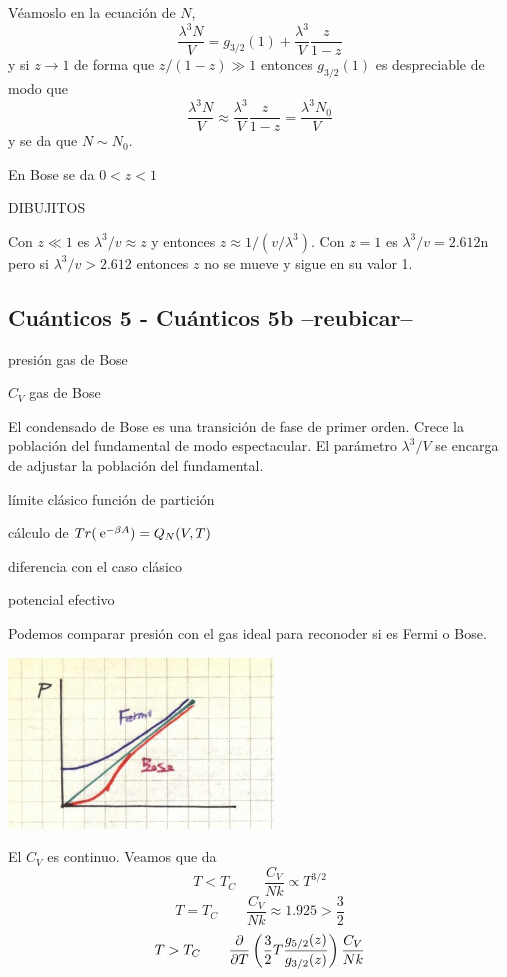 \documentclass[10pt,oneside]{CBFT_book}
\begin{document}
Véamoslo en la ecuación de $N$,
\[
	\frac{\lambda^3 N}{V} = g_{3/2}(1) + \frac{\lambda^3}{V} \frac{z}{1-z}
\]
y si $z \to 1$ de forma que $z/(1-z) \gg 1$ entonces $g_{3/2}(1)$ es despreciable de modo que
\[
	\frac{\lambda^3 N}{V} \approx \frac{\lambda^3}{V} \frac{z}{1-z} = \frac{\lambda^3 N_0}{V} 
\]
y se da que $ N \sim N_0 $.

En Bose se da $ 0 < z < 1$

DIBUJITOS

Con $ z \ll 1$ es $ \lambda^3 / v \approx z $ y entonces $ z \approx 1/ (v/\lambda^3) $.
Con $ z=1 $ es $ \lambda^3 / v = 2.612$n pero si $ \lambda^3 / v > 2.612 $ entonces $z$ no se mueve y
sigue en su valor 1.


\subsection{Cuánticos 5 - Cuánticos 5b --reubicar--}

presión gas de Bose

$C_V$ gas de Bose

El condensado de Bose es una transición de fase de primer orden.
Crece la población del fundamental de modo espectacular. El parámetro $ \lambda^3/V $ se encarga de
adjustar la población del fundamental.

límite clásico función de partición

cálculo de $ Tr (\:\mathrm{e}^{-\beta A} ) = Q_N(V,T) $

diferencia con el caso clásico

potencial efectivo


Podemos comparar presión con el gas ideal para reconoder si es Fermi o Bose.

\includegraphics[scale=0.5]{images/1606329551.jpg}


El $C_V$ es continuo. Veamos que da
\[
	T<T_C \qquad \frac{C_V}{Nk} \propto T^{3/2}
\]
\[
	T=T_C \qquad \frac{C_V}{Nk} \approx 1.925 > \frac 3 2
\]
\[
	T>T_C \qquad \frac{\partial^{\hspace{-0.05em}} {}}{\partial {T}^{\hspace{-0.05em}}}\left( \frac{3}{2} T \frac{g_{5/2}(z)}{g_{3/2}(z)} \right) \frac{C_V}{Nk} 
\]
\end{document}
